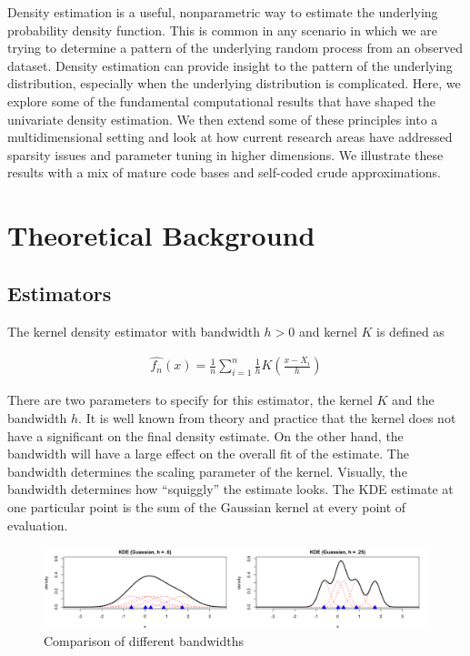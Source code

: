\documentclass[12pt]{article}
\begin{document}
Density estimation is a useful, nonparametric way to estimate the
underlying probability density function. This is common in any scenario
in which we are trying to determine a pattern of the underlying random
process from an observed dataset. Density estimation can provide insight
to the pattern of the underlying distribution, especially when the
underlying distribution is complicated. Here, we explore some of the
fundamental computational results that have shaped the univariate
density estimation. We then extend some of these principles into a
multidimensional setting and look at how current research areas have
addressed sparsity issues and parameter tuning in higher dimensions. We
illustrate these results with a mix of mature code bases and self-coded
crude approximations.

\section{Theoretical Background}\label{theoretical-background}

\subsection{Estimators}\label{estimators}

The kernel density estimator with bandwidth \(h > 0\) and kernel \(K\)
is defined as

\[
\begin{aligned}
\hat{f_n}(x) = \frac{1}{n} \sum_{i=1}^{n} \frac{1}{h} K\left(\frac{x-X_i}{h}\right)
\end{aligned}
\]

There are two parameters to specify for this estimator, the kernel \(K\)
and the bandwidth \(h\). It is well known from theory and practice that
the kernel does not have a significant on the final density estimate. On
the other hand, the bandwidth will have a large effect on the overall
fit of the estimate. The bandwidth determines the scaling parameter of
the kernel. Visually, the bandwidth determines how ``squiggly'' the
estimate looks. The KDE estimate at one particular point is the sum of
the Gaussian kernel at every point of evaluation.

\begin{figure}[h]
\label{fig:bandwidth}
\caption{Comparison of different bandwidths}
\includegraphics[scale=.31]{bandwidth_fig}
\end{figure}
\end{document}
